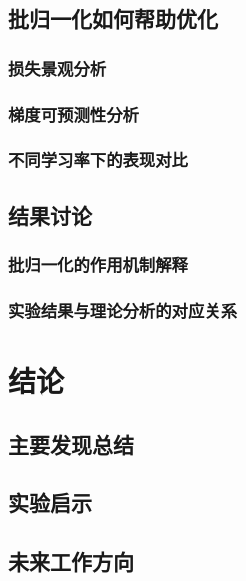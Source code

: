 \documentclass[12pt,a4paper]{article}
\begin{document}
\subsection{批归一化如何帮助优化}
\subsubsection{损失景观分析}

\subsubsection{梯度可预测性分析}

\subsubsection{不同学习率下的表现对比}

\subsection{结果讨论}
\subsubsection{批归一化的作用机制解释}

\subsubsection{实验结果与理论分析的对应关系}

\section{结论}
\subsection{主要发现总结}

\subsection{实验启示}

\subsection{未来工作方向}
\end{document}
